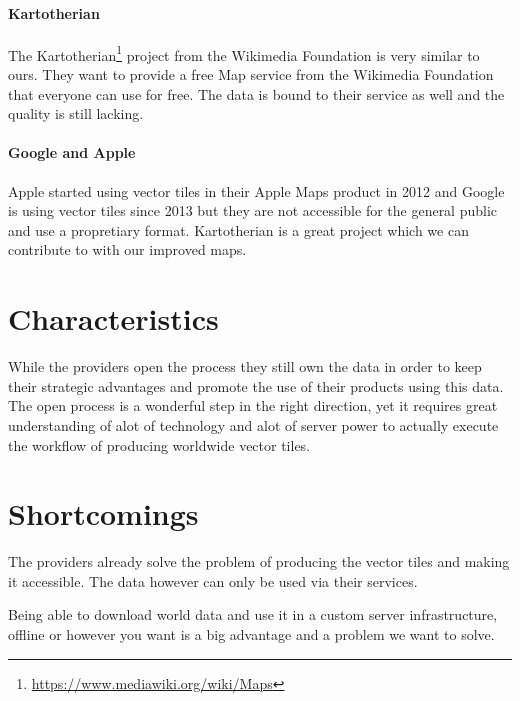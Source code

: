 \paragraph{Kartotherian}

The Kartotherian\footnote{\url{https://www.mediawiki.org/wiki/Maps}} project from the Wikimedia Foundation is very similar to ours. They want to provide a free Map service from the Wikimedia Foundation that everyone can use for free. The data is bound to their service as well and the quality is still lacking.

\paragraph{Google and Apple}

Apple started using vector tiles in their Apple Maps product in 2012\cite{wiki:apple-maps}  and  Google is using vector tiles since 2013\cite{wiki:google-maps} but they are not accessible for the general public and use a propretiary format. Kartotherian is a great project which we can contribute to with
our improved maps.

\section{Characteristics}

While the providers open the process they still own the data in order
to keep their strategic advantages and promote the use
of their products using this data. The open process is a wonderful
step in the right direction, yet it requires great understanding
of alot of technology and alot of server power to actually
execute the workflow of producing worldwide vector tiles.


\section{Shortcomings}

The providers already solve the problem of producing the vector tiles
and making it accessible. The data however can only be used
via their services.

Being able to download world data and use it in a custom server
infrastructure, offline or however you want is a big advantage
and a problem we want to solve.

\newpage